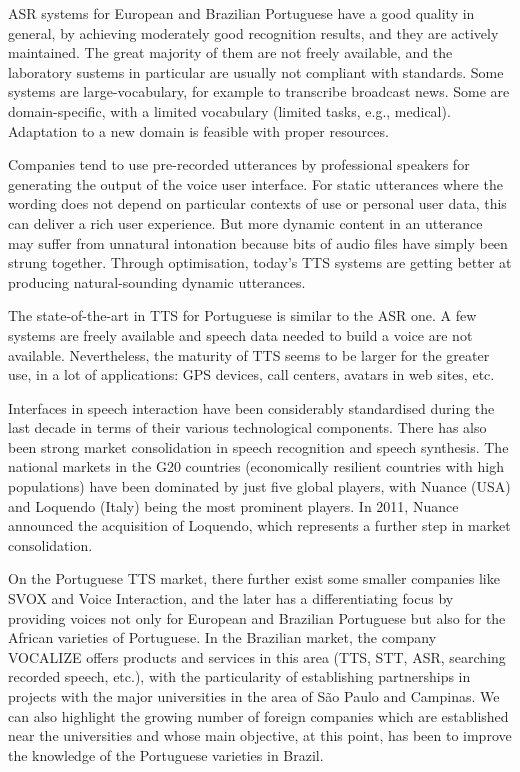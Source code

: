\documentclass[]{../metanetpaper}
\begin{document}
\begin{multicols}{2}
ASR systems for European and Brazilian Portuguese have a good quality in general, by achieving moderately good recognition results, and they are actively maintained. The great majority of them are not freely available, and the laboratory sustems in particular are usually not compliant with standards. Some systems are large-vocabulary, for example to transcribe broadcast news. Some are domain-specific, with a limited vocabulary (limited tasks, e.g., medical). Adaptation to a new domain is feasible with proper resources.


Companies tend to use pre-recorded utterances by professional speakers for generating the output of the voice user interface. For static utterances where the wording does not depend on particular contexts of use or personal user data, this can deliver a rich user experience. But more dynamic content in an utterance may suffer from unnatural intonation because bits of audio files have simply been strung together. Through optimisation, today’s TTS systems are getting better at producing natural-sounding dynamic utterances.

The state-of-the-art in TTS for Portuguese is similar to the ASR one. A few systems are freely available and speech data needed to build a voice are not available. Nevertheless, the maturity of TTS seems to be larger for the greater use, in a lot of applications: GPS devices, call centers, avatars in web sites, etc.

Interfaces in speech interaction have been considerably standardised during the last decade in terms of their various technological components. There has also been strong market consolidation in speech recognition and speech synthesis. The national markets in the G20 countries (economically resilient countries with high populations) have been dominated by just five global players, with Nuance (USA) and Loquendo (Italy) being the most prominent players. In 2011, Nuance announced the acquisition of Loquendo, which represents a further step in market consolidation.

On the Portuguese TTS market, there further exist some smaller companies like SVOX and Voice Interaction, and the later has a differentiating focus by providing voices not only for European and Brazilian Portuguese but also for the African varieties of Portuguese. In the Brazilian market, the company VOCALIZE offers products and services in this area (TTS, STT, ASR, searching recorded speech, etc.), with the particularity of establishing partnerships in projects with the major universities in the area of São Paulo and Campinas\cite{neto}. We can also highlight the growing number of foreign companies which are established near the universities and whose main objective, at this point, has been to improve the knowledge of the Portuguese varieties in Brazil.


\end{multicols}
\end{document}
